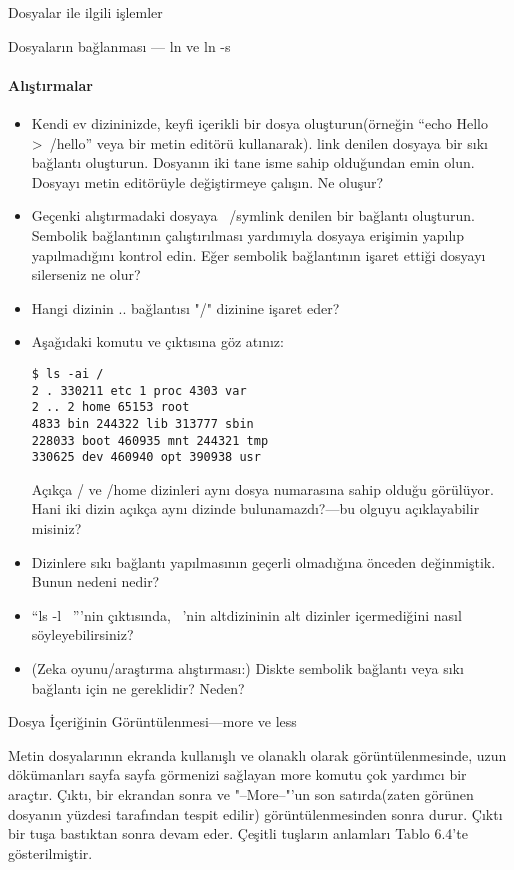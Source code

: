 \begin{section}{Dosyalar ile ilgili işlemler}
\begin{subsection}{Dosyaların bağlanması — ln ve ln -s}
\paragraph{Alıştırmalar}{
\begin{itemize}
 \item Kendi ev dizininizde, keyfi içerikli bir dosya oluşturun(örneğin “echo Hello >~/hello” veya bir metin editörü kullanarak). link denilen dosyaya bir sıkı bağlantı oluşturun. Dosyanın iki tane isme sahip olduğundan emin olun. Dosyayı metin editörüyle değiştirmeye çalışın. Ne oluşur?
 \item Geçenki alıştırmadaki dosyaya ~/symlink denilen bir bağlantı oluşturun. Sembolik bağlantının çalıştırılması yardımıyla dosyaya erişimin yapılıp yapılmadığını kontrol edin. Eğer sembolik bağlantının işaret ettiği dosyayı silerseniz ne olur?
 \item Hangi dizinin .. bağlantısı "/" dizinine işaret eder?
 \item Aşağıdaki komutu ve çıktısına göz atınız:\begin{verbatim}
$ ls -ai /
2 . 330211 etc 1 proc 4303 var
2 .. 2 home 65153 root
4833 bin 244322 lib 313777 sbin
228033 boot 460935 mnt 244321 tmp
330625 dev 460940 opt 390938 usr 
 \end{verbatim} Açıkça / ve /home dizinleri aynı dosya numarasına sahip olduğu görülüyor. Hani iki dizin açıkça aynı dizinde bulunamazdı?—bu olguyu açıklayabilir misiniz?
 \item Dizinlere sıkı bağlantı yapılmasının geçerli olmadığına önceden değinmiştik. Bunun nedeni nedir?
 \item “ls -l ~”'nin çıktısında, ~'nin altdizininin alt dizinler içermediğini nasıl söyleyebilirsiniz?
 \item (Zeka oyunu/araştırma alıştırması:) Diskte sembolik bağlantı veya sıkı bağlantı için ne gereklidir? Neden?
\end{itemize}}
\end{subsection}
\begin{subsection}{Dosya İçeriğinin Görüntülenmesi—more ve less}

Metin dosyalarının ekranda kullanışlı ve olanaklı olarak görüntülenmesinde, uzun dökümanları sayfa sayfa görmenizi sağlayan more komutu çok yardımcı bir araçtır. Çıktı, bir ekrandan sonra ve "--More--"'un son satırda(zaten görünen dosyanın yüzdesi tarafından tespit edilir) görüntülenmesinden sonra durur. Çıktı bir tuşa bastıktan sonra devam eder. Çeşitli tuşların anlamları Tablo 6.4'te gösterilmiştir.


\end{subsection}
\end{section}
